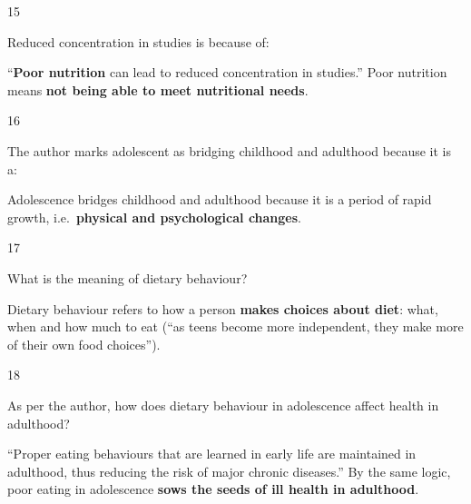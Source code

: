 \begin{question}{15}
{Reduced concentration in studies is because of:\par}
\begin{explain}
``\textbf{Poor nutrition} can lead to reduced concentration in studies.'' Poor nutrition means \textbf{not being able to meet nutritional needs}.
\end{explain}
\end{question}

\begin{question}{16}
{The author marks adolescent as bridging childhood and adulthood because it is a:\par}
\begin{explain}
Adolescence bridges childhood and adulthood because it is a period of rapid growth, i.e.\ \textbf{physical and psychological changes}.
\end{explain}
\end{question}

\begin{question}{17}
{What is the meaning of dietary behaviour?\par}
\begin{explain}
Dietary behaviour refers to how a person \textbf{makes choices about diet}: what, when and how much to eat (``as teens become more independent, they make more of their own food choices'').
\end{explain}
\end{question}

\begin{question}{18}
{As per the author, how does dietary behaviour in adolescence affect health in adulthood?\par}
\begin{explain}
``Proper eating behaviours that are learned in early life are maintained in adulthood, thus reducing the risk of major chronic diseases.'' By the same logic, poor eating in adolescence \textbf{sows the seeds of ill health in adulthood}.
\end{explain}
\end{question}

